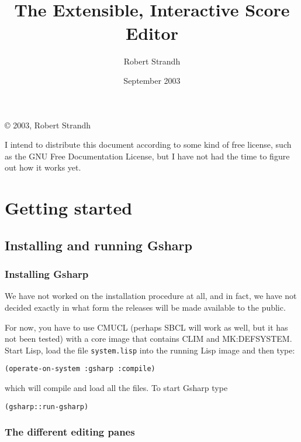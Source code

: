 \documentclass[11pt]{book}
\title{{\Huge {\gs}}\\{\huge The Extensible, Interactive Score Editor}}
\author{{\Large Robert Strandh}}
\date{September 2003}
\def\gs{Gsharp}
\def\clim{CLIM}
\def\lisp{Lisp}
\def\inputtex#1{}
\begin{document}

\maketitle

\newpage

\vspace*{\fill}
\copyright{} 2003, Robert Strandh

I intend to distribute this document according to some kind of free
license, such as the GNU Free Documentation License, but I have not
had the time to figure out how it works yet. 

\newpage

{\setlength{\parskip}{0cm}
\tableofcontents}

\inputtex{intro.tex}

\part{Getting started}

\chapter{Installing and running {\gs}}

\section{Installing {\gs}}

We have not worked on the installation procedure at all, and in fact,
we have not decided exactly in what form the releases will be made
available to the public.  

For now, you have to use CMUCL (perhaps SBCL will work as well, but it
has not been tested) with a core image that contains {\clim} and
MK:DEFSYSTEM.  Start {\lisp}, load the file \texttt{system.lisp} into
the running {\lisp} image and then type: 

\texttt{(operate-on-system :gsharp :compile)}

which will compile and load all the files. To start {\gs} type 

\texttt{(gsharp::run-gsharp)}

\section{The different editing panes}
\end{document}
